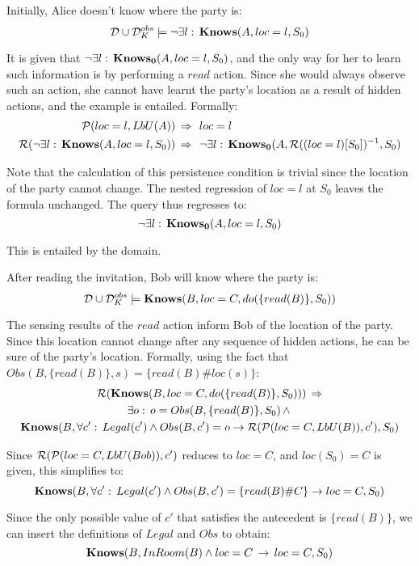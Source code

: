 \begin{example}
Initially, Alice doesn't know where the party is:\[
\mathcal{D}\cup\mathcal{D}_{K}^{obs}\models\neg\exists l:\,\mathbf{Knows}(A,loc=l,S_{0})\]

\end{example}
It is given that $\neg\exists l:\,\mathbf{Knows_{0}}(A,loc=l,S_{0})$, and the
only way for her to learn such information is by performing a $read$
action. Since she would always observe such an action, she cannot
have learnt the party's location as a result of hidden actions, and
the example is entailed. Formally:\begin{align*}
\mathcal{P}(loc=l,LbU(A))\,\Rightarrow\,\,\,\, & loc=l\\
\mathcal{R}(\neg\exists l:\,\mathbf{Knows}(A,loc=l,S_{0}))\,\Rightarrow\,\,\,\, & \neg\exists l:\,\mathbf{Knows_{0}}(A,\mathcal{R}((loc=l)[S_{0}])^{-1},S_{0})\end{align*}


Note that the calculation of this persistence condition is trivial
since the location of the party cannot change. The nested regression
of $loc=l$ at $S_{0}$ leaves the formula unchanged. The query thus
regresses to:\[
\neg\exists l:\,\mathbf{Knows_{0}}(A,loc=l,S_{0})\]


This is entailed by the domain.

\begin{example}
After reading the invitation, Bob will know where the party is:\[
\mathcal{D}\cup\mathcal{D}_{K}^{obs}\models\mathbf{Knows}(B,loc=C,do(\{read(B)\},S_{0}))\]

\end{example}
The sensing results of the $read$ action inform Bob of the location
of the party. Since this location cannot change after any sequence
of hidden actions, he can be sure of the party's location. Formally,
using the fact that $Obs(B,\{read(B)\},s)=\{read(B)\#loc(s)\}$:\begin{multline*}
\mathcal{R}(\mathbf{Knows}(B,loc=C,do(\{read(B)\},S_{0})))\,\Rightarrow\\
\exists o:\, o=Obs(B,\{read(B)\},S_{0})\,\wedge\,\\
\mathbf{Knows}(B,\forall c':\, Legal(c')\wedge Obs(B,c')=o\rightarrow\mathcal{R}(\mathcal{P}(loc=C,LbU(B)),c'),S_{0})\end{multline*}


Since $\mathcal{R}(\mathcal{P}(loc=C,LbU(Bob)),c')$ reduces to $loc=C$, and $loc(S_{0})=C$
is given, this simplifies to:\[
\mathbf{Knows}(B,\forall c':\, Legal(c')\wedge Obs(B,c')=\{read(B)\#C\}\rightarrow loc=C,S_{0})\]


Since the only possible value of $c'$ that satisfies the antecedent
is $\{read(B)\}$, we can insert the definitions of $Legal$ and $Obs$
to obtain:\[
\mathbf{Knows}(B,InRoom(B)\wedge loc=C\,\rightarrow\, loc=C,S_{0})\]


